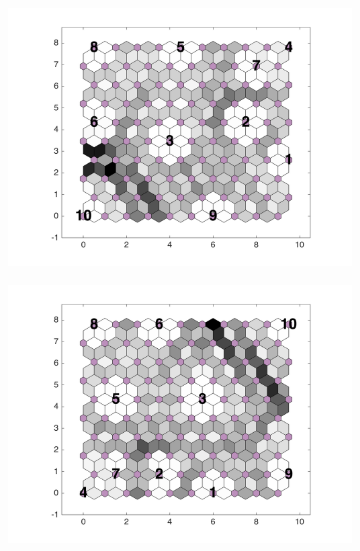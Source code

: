 \begin{figure}
\begin{subfigure}[b]{0.3\textwidth}
        \includegraphics[width=\textwidth]{../../images0.01/M31/2D/diff_dimension/combine_2D_data_between_cols3and17.png}
        \label{fig: col3and17_dist}
    \end{subfigure}
        \hfill
    \begin{subfigure}[b]{0.3\textwidth}
        \centering
        \includegraphics[width=\textwidth]{../../images0.01/M31/2D/diff_dimension/combine_2D_data_between_cols3and18.png}
        \label{fig: col3and18_dist}
    \end{subfigure}
        \hfill
    \begin{subfigure}[b]{0.3\textwidth}
        \centering

\end{subfigure}
\end{figure}
